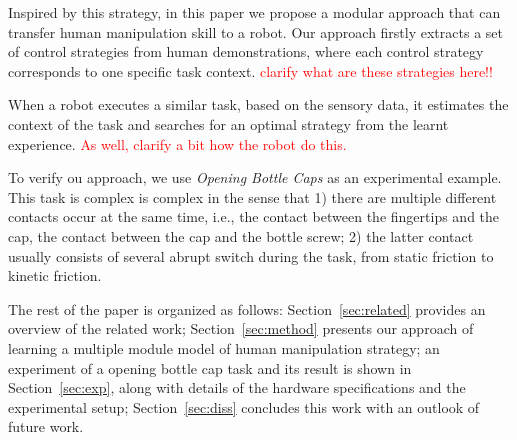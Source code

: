 Inspired by this strategy, in this paper we propose a modular approach that can transfer human manipulation skill to a robot.
Our approach firstly extracts a set of control strategies from human demonstrations, where each control strategy corresponds to one specific task context. \textcolor{red}{clarify what are these strategies here!!}

When a robot executes a similar task, based on the sensory data, it estimates the context of the task and searches for an optimal strategy from the learnt experience. \textcolor{red}{As well, clarify a bit how the robot do this.} 


To verify ou approach, we use \emph{Opening Bottle Caps} as an experimental example. This task is complex is complex in the sense that 1) there are multiple different contacts occur at the same time, i.e., the contact between the fingertips and the cap, the contact between the cap and the bottle screw; 2) the latter contact usually consists of several abrupt switch during the task, from static friction to kinetic friction.

The rest of the paper is organized as follows: Section~\ref{sec:related} provides an overview of the related work; Section~\ref{sec:method} presents our approach of learning a multiple module model of human manipulation strategy; an experiment of a opening bottle cap task and its result is shown in Section~\ref{sec:exp}, along with details of the hardware specifications and the experimental setup; Section~\ref{sec:diss} concludes this work with an outlook of future work. 